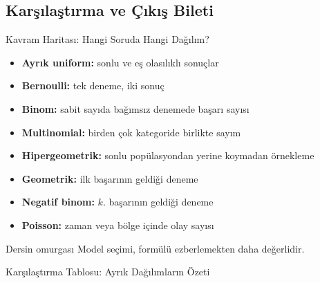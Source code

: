 \documentclass[light]{lutbeamer}
\begin{document}
\subsection{Karşılaştırma ve Çıkış Bileti}

\begin{frame}{Kavram Haritası: Hangi Soruda Hangi Dağılım?}
    \small
    \begin{itemize}
        \item \textbf{Ayrık uniform:} sonlu ve eş olasılıklı sonuçlar
        \item \textbf{Bernoulli:} tek deneme, iki sonuç
        \item \textbf{Binom:} sabit sayıda bağımsız denemede başarı sayısı
        \item \textbf{Multinomial:} birden çok kategoride birlikte sayım
        \item \textbf{Hipergeometrik:} sonlu popülasyondan yerine koymadan örnekleme
        \item \textbf{Geometrik:} ilk başarının geldiği deneme
        \item \textbf{Negatif binom:} \(k\). başarının geldiği deneme
        \item \textbf{Poisson:} zaman veya bölge içinde olay sayısı
    \end{itemize}

    \begin{exampleblock}{Dersin omurgası}
        Model seçimi, formülü ezberlemekten daha değerlidir.
    \end{exampleblock}
\end{frame}

\begin{frame}{Karşılaştırma Tablosu: Ayrık Dağılımların Özeti}
    \scriptsize
    \begin{center}
    \end{center}
\end{frame}
\end{document}
